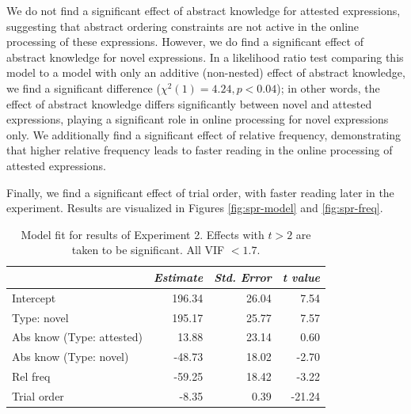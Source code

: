 \documentclass[authoryear]{elsarticle}
\begin{document}
We do not find a significant effect of abstract knowledge for attested expressions, suggesting that abstract ordering constraints are not active in the online processing of these expressions. However, we do find a significant effect of abstract knowledge for novel expressions. In a likelihood ratio test comparing this model to a model with only an additive (non-nested) effect of abstract knowledge, we find a significant difference ($\chi^{2}(1)=4.24, p<0.04$); in other words, the effect of abstract knowledge differs significantly between novel and attested expressions, playing a significant role in online processing for novel expressions only.
We additionally find a significant effect of relative frequency, demonstrating that higher relative frequency leads to faster reading in the online processing of attested expressions. 

Finally, we find a significant effect of trial order, with faster reading later in the experiment. Results are visualized in Figures \ref{fig:spr-model} and \ref{fig:spr-freq}.

\begin{table}[t]
\centering
\begin{tabular}{ l  r  r  r  }
\hline\hline
 & \emph{Estimate} &\emph{Std. Error} & \emph{t value}  \\\hline    
Intercept   &  196.34   &  26.04   & 7.54\\ 
Type: novel & 195.17 &    25.77  & 7.57\\ 
Abs know (Type: attested)      &   13.88    & 23.14  &  0.60\\ 
Abs know (Type: novel) & -48.73 &     18.02 &  -2.70 \\ 
Rel freq &  -59.25  &   18.42  & -3.22\\ 
Trial order &           -8.35   &   0.39 & -21.24\\\hline 
\end{tabular}
\caption{Model fit for results of Experiment 2. Effects with $t>2$ are taken to be significant. All VIF $< 1.7$.}\label{t:spr-all}
\end{table}
\end{document}
